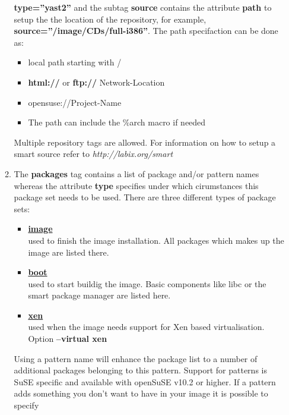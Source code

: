 \begin{itemize}
\begin{enumerate}
                \textbf{type=''yast2''} and the subtag \textbf{source}
                contains the attribute \textbf{path} to setup the
                the location of the repository, for example,
                \textbf{source=''/image/CDs/full-i386''}. The path
                specifaction can be done as:
                \begin{itemize}
                \item local path starting with /
                \item \textbf{html://} or \textbf{ftp://} Network-Location
                \item opensuse://Project-Name
                \item The path can include the \%arch macro if needed
                \end{itemize}
                Multiple repository
                tags are allowed. For information on how to setup a smart
                source refer to \textit{http://labix.org/smart}
		  \item The \textbf{packages} tag contains a list of package and/or
				pattern names whereas the attribute \textbf{type} specifies
				under which cirumstances this package set needs to be used.
				There are three different types of package sets:
                \begin{itemize}
                \item \textbf{\underline{image}}\\
                      used to finish the image installation. All packages
                      which makes up the image are listed there.
                \item \textbf{\underline{boot}}\\
                      used to start buildig the image. Basic components
                      like libc or the smart package manager are listed
                      here.
                \item \textbf{\underline{xen}}\\
                      used when the image needs support for Xen based
                      virtualisation. Option \textbf{--virtual xen}
                \end{itemize}
				Using a pattern name will enhance the package list to
				a number of additional packages belonging to this pattern.
				Support for patterns is SuSE specific and available with
				openSuSE v10.2 or higher. If a pattern adds something you
                don't want to have in your image it is possible to specify

\end{enumerate}
\end{itemize}
